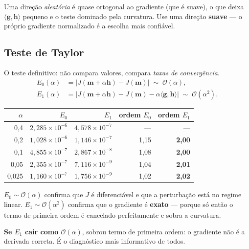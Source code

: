 \documentclass[11pt,a4paper,oneside]{report}
\begin{document}
\begin{atencao}
Uma direção \emph{aleatória} é quase ortogonal ao gradiente (que é suave), o
que deixa $\langle\mathbf{g},\mathbf{h}\rangle$ pequeno e o teste dominado
pela curvatura. Use uma direção \textbf{suave} --- o próprio gradiente
normalizado é a escolha mais confiável.
\end{atencao}

\subsection{Teste de Taylor}

O teste definitivo: não compara valores, compara \emph{taxas de convergência}.
\begin{align}
E_0(\alpha) &= \bigl|J(\mathbf{m}+\alpha\mathbf{h}) - J(\mathbf{m})\bigr|
 \;\sim\; \mathcal{O}(\alpha), \\
E_1(\alpha) &= \bigl|J(\mathbf{m}+\alpha\mathbf{h}) - J(\mathbf{m})
 - \alpha\langle\mathbf{g},\mathbf{h}\rangle\bigr|
 \;\sim\; \mathcal{O}(\alpha^{2}).
\end{align}

\begin{center}
\begin{tabular}{@{}rrrrr@{}}
\toprule
$\alpha$ & $E_0$ & $E_1$ & ordem $E_0$ & ordem $E_1$ \\
\midrule
0{,}4   & $2{,}285\times10^{-6}$ & $4{,}578\times10^{-7}$ & --- & --- \\
0{,}2   & $1{,}028\times10^{-6}$ & $1{,}146\times10^{-7}$ & 1{,}15 & \textbf{2{,}00} \\
0{,}1   & $4{,}855\times10^{-7}$ & $2{,}867\times10^{-8}$ & 1{,}08 & \textbf{2{,}00} \\
0{,}05  & $2{,}355\times10^{-7}$ & $7{,}116\times10^{-9}$ & 1{,}04 & \textbf{2{,}01} \\
0{,}025 & $1{,}160\times10^{-7}$ & $1{,}756\times10^{-9}$ & 1{,}02 & \textbf{2{,}02} \\
\bottomrule
\end{tabular}
\end{center}

$E_0 \sim \mathcal{O}(\alpha)$ confirma que $J$ é diferenciável e que a
perturbação está no regime linear. $E_1 \sim \mathcal{O}(\alpha^{2})$ confirma
que o gradiente é \textbf{exato} --- porque só então o termo de primeira ordem
é cancelado perfeitamente e sobra a curvatura.

\textbf{Se $E_1$ cair como $\mathcal{O}(\alpha)$}, sobrou termo de primeira
ordem: o gradiente não é a derivada correta. É o diagnóstico mais informativo
de todos.
\end{document}
